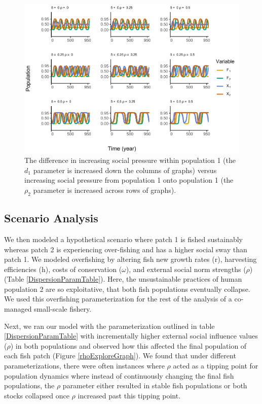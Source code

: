 \documentclass[
  12pt,
]{article}
\begin{document}
\begin{figure}
\centering
\includegraphics{Wulfing_CH2_Draft4_files/figure-latex/influenceAsym-1.pdf}
\caption{\label{fig:influenceAsym}The difference in increasing social pressure within population 1 (the \(d_1\) parameter is increased down the columns of graphs) versus increasing social pressure from population 1 onto population 1 (the \(\rho_2\) parameter is increased across rows of graphs). \label{influenceAsym}}
\end{figure}

\hypertarget{scenario-analysis}{%
\subsection{Scenario Analysis}\label{scenario-analysis}}

We then modeled a hypothetical scenario where patch 1 is fished sustainably whereas patch 2 is experiencing over-fishing and has a higher social sway than patch 1. We modeled overfishing by altering fish new growth rates (r), harvesting efficiencies (h), costs of conservation (\(\omega\)), and external social norm strengths (\(\rho\)) (Table \ref{DispersionParamTable}). Here, the unsustainable practices of human population 2 are so exploitative, that both fish populations eventually collapse. We used this overfishing parameterization for the rest of the analysis of a co-managed small-scale fishery.



Next, we ran our model with the parameterization outlined in table \ref{DispersionParamTable} with incrementally higher external social influence values (\(\rho\)) in both populations and observed how this affected the final population of each fish patch (Figure \ref{rhoExploreGraph}). We found that under different parameterizations, there were often instances where \(\rho\) acted as a tipping point for population dynamics where instead of continuously changing the final fish populations, the \(\rho\) parameter either resulted in stable fish populations or both stocks collapsed once \(\rho\) increased past this tipping point.
\end{document}
